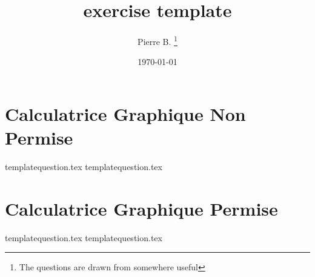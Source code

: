 \documentclass[10pt]{article}
\newcounter{question}
\begin{document}
 
\title{exercise template}
\author{Pierre B. \thanks{The questions are drawn from somewhere useful}}
\date{\today}
\maketitle

\newpage
\section*{\textbf{Calculatrice Graphique Non Permise}}
{templatequestion.tex}
\bigskip
{templatequestion.tex}
\newpage
\section*{\textbf{Calculatrice Graphique Permise}}
{templatequestion.tex}
\bigskip
{templatequestion.tex}
\end{document}
